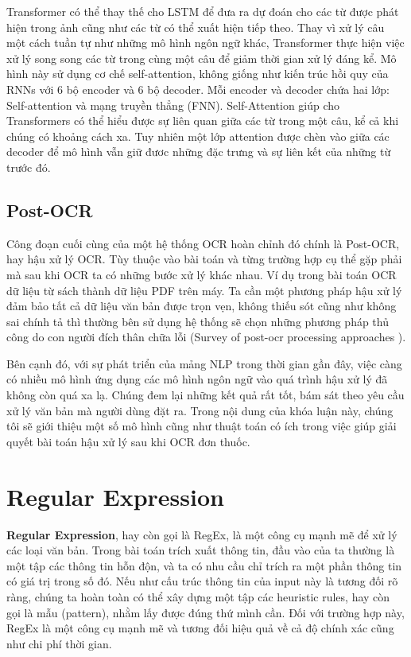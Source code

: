 Transformer \cite{gillioz2020overview} có thể thay thế cho LSTM để đưa ra dự đoán cho các từ được phát hiện trong
ảnh cũng như các từ có thể xuất hiện tiếp theo. Thay vì xử lý câu một cách tuần tự như
những mô hình ngôn ngữ khác, Transformer thực hiện việc xử lý song song các từ trong
cùng một câu để giảm thời gian xử lý đáng kể. Mô hình này sử dụng cơ chế self-attention,
không giống như kiến trúc hồi quy của RNNs với 6 bộ encoder và 6 bộ decoder. Mỗi
encoder và decoder chứa hai lớp: Self-attention và mạng truyền thẳng (FNN). Self-Attention
giúp cho Transformers có thể hiểu được sự liên quan giữa các từ trong một câu, kể cả khi
chúng có khoảng cách xa. Tuy nhiên một lớp attention được chèn vào giữa các decoder để
mô hình vẫn giữ đươc những đặc trưng và sự liên kết của những từ trước đó.

\subsection{Post-OCR}

Công đoạn cuối cùng của một hệ thống OCR hoàn chỉnh đó chính là Post-OCR, hay hậu xử
lý OCR. Tùy thuộc vào bài toán và từng trường hợp cụ thể gặp phải mà sau khi OCR ta có
những bước xử lý khác nhau. Ví dụ trong bài toán OCR dữ liệu từ sách thành dữ liệu PDF
trên máy. Ta cần một phương pháp hậu xử lý đảm bảo tất cả dữ liệu văn bản được trọn vẹn,
không thiếu sót cũng như không sai chính tả thì thường bên sử dụng hệ thống sẽ chọn
những phương pháp thủ công do con người đích thân chữa lỗi (Survey of post-ocr processing approaches \cite{nguyen2021survey}).

Bên cạnh đó, với sự phát triển của mảng NLP trong thời gian gần đây, việc càng có nhiều
mô hình ứng dụng các mô hình ngôn ngữ vào quá trình hậu xử lý đã không còn quá xa lạ.
Chúng đem lại những kết quả rất tốt, bám sát theo yêu cầu xử lý văn bản mà người dùng
đặt ra. Trong nội dung của khóa luận này, chúng tôi sẽ giới thiệu một số mô hình cũng như
thuật toán có ích trong việc giúp giải quyết bài toán hậu xử lý sau khi OCR đơn thuốc.

\section{Regular Expression}

\textbf{Regular Expression}, hay còn gọi là RegEx, là một công cụ mạnh mẽ để xử lý các loại văn bản. Trong bài toán trích xuất thông tin, đầu vào của ta thường là một tập các thông tin hỗn độn, và ta có nhu cầu chỉ trích ra một phần thông tin có giá trị trong số đó. Nếu như cấu trúc thông tin của input này là tương đối rõ ràng, chúng ta hoàn toàn có thể xây dựng một tập các heuristic rules, hay còn gọi là mẫu (pattern), nhằm lấy được đúng thứ mình cần. Đối với trường hợp này, RegEx là một công cụ mạnh mẽ và tương đối hiệu quả về cả độ chính xác cũng như chi phí thời gian.

